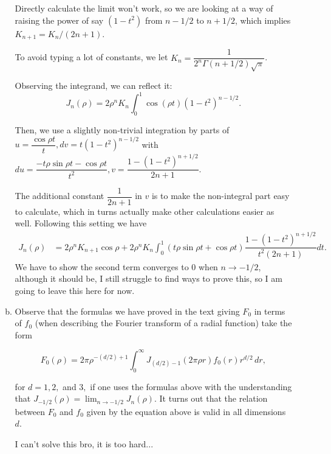 \documentclass{article}
\begin{document}
\begin{enumerate}
\begin{enumerate}[(a)]
\begin{solution}
            Directly calculate the limit won't work, so we are looking at a way of raising the power
            of say $(1-t^2)$ from $n-1/2$ to $n+1/2$, which implies $K_{n+1} = K_n/(2n+1)$. 
            
            To avoid typing a lot of constants, we let $K_n=\dfrac1{2^n \Gamma(n+1/2)\sqrt\pi}$. 

            Observing the integrand, we can reflect it: 
            $$J_n(\rho)=2\rho^n K_n\int_0^1 \cos(\rho t) (1-t^2)^{n-1/2}.$$

            Then, we use a slightly non-trivial integration by parts of 
            $u=\dfrac{\cos \rho t}{t}, dv = t(1-t^2)^{n-1/2}$ with
            $du=\dfrac{-t\rho \sin\rho t-\cos\rho t}{t^2}, v = \dfrac{1-(1-t^2)^{n+1/2}}{2n+1}$.

            The additional constant $\dfrac1{2n+1}$ in $v$ is to make the non-integral part easy to calculate,
            which in turns actually make other calculations easier as well.
            Following this setting we have
            \begin{align*}
                J_n(\rho)&= 2\rho^n K_{n+1} \cos\rho + 2\rho^n K_n \int_0^1 (t\rho \sin\rho t + \cos\rho t)\dfrac{1-(1-t^2)^{n+1/2}}{t^2(2n+1)}dt.
            \end{align*}
            We have to show the second term converges to $0$ when $n\to -1/2$, although it should be, I still struggle to find
            ways to prove this, so I am going to leave this here for now.
        \end{solution}

        \item Observe that the formulas we have proved in the text giving $F_0$ in terms of $f_0$ (when describing
        the Fourier transform of a radial function) take the form

        $$F_0(\rho) = 2\pi \rho^{-(d/2)+1} \int_0^\infty J_{(d/2)-1}(2\pi \rho r)f_0(r) r^{d/2}\, dr,$$

        for $d=1,2,$ and $3,$ if one uses the formulas above with the understanding that
        $J_{-1/2}(\rho)=\lim_{n\to-1/2}J_n(\rho)$.
        It turns out that the relation between $F_0$ and $f_0$ given by the equation above is valid in all dimensions $d$.

        \begin{solution}
            I can't solve this bro, it is too hard...
        \end{solution}
    \end{enumerate}


\end{enumerate}
\end{document}
